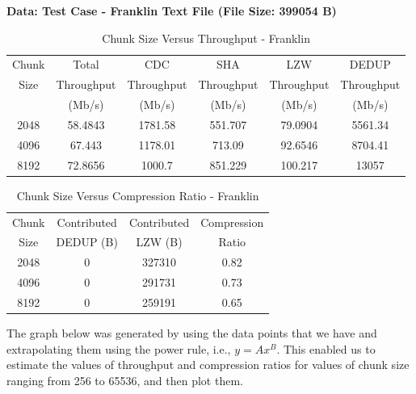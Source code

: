 \documentclass[../main.tex]{subfiles}
\begin{document}
\noindent \textbf{Data: Test Case - Franklin Text File (File Size: 399054 B)}

\begin{table}[H]
    \centering
    \begin{tabular}{|c|c|c|c|c|c|} \hline 
         Chunk&  Total&  CDC &  SHA &  LZW &  DEDUP \\ 
         Size& Throughput&  Throughput&  Throughput&  Throughput&  Throughput \\
         & (Mb/s)&  (Mb/s)&  (Mb/s)&  (Mb/s)&  (Mb/s) \\ \hline
         2048&  58.4843&  1781.58&  551.707&  79.0904&  5561.34 \\ \hline 
         4096&  67.443&  1178.01&  713.09&  92.6546&  8704.41\\ \hline 
         8192&  72.8656&  1000.7&  851.229&  100.217&  13057 \\ \hline
    \end{tabular}
    \caption{Chunk Size Versus Throughput - Franklin}
    \label{tab:chunk_graph}
\end{table}

\vspace{1cm}

\begin{table}[H]
    \centering
    \begin{tabular}{|c|c|c|c|} \hline 
         Chunk&  Contributed & Contributed& Compression\\
         Size&  DEDUP (B)& LZW (B)& Ratio\\ \hline
         2048&  0&  327310& 0.82\\ \hline 
         4096&  0&  291731& 0.73\\ \hline 
         8192&  0&  259191& 0.65\\ \hline
    \end{tabular}
    \caption{Chunk Size Versus Compression Ratio - Franklin}
    \label{tab:chunk_comp}
\end{table}

\vspace{0.5cm}

\noindent The graph below was generated by using the data points that we have and extrapolating them using the power rule, i.e., $y=Ax^B$. This enabled us to estimate the values of throughput and compression ratios for values of chunk size ranging from 256 to 65536, and then plot them. \\
\end{document}
